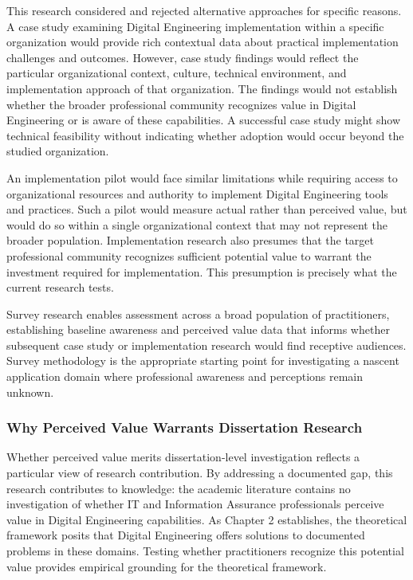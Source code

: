 This research considered and rejected alternative approaches for specific reasons. A case study examining Digital Engineering implementation within a specific organization would provide rich contextual data about practical implementation challenges and outcomes. However, case study findings would reflect the particular organizational context, culture, technical environment, and implementation approach of that organization. The findings would not establish whether the broader professional community recognizes value in Digital Engineering or is aware of these capabilities. A successful case study might show technical feasibility without indicating whether adoption would occur beyond the studied organization.

An implementation pilot would face similar limitations while requiring access to organizational resources and authority to implement Digital Engineering tools and practices. Such a pilot would measure actual rather than perceived value, but would do so within a single organizational context that may not represent the broader population. Implementation research also presumes that the target professional community recognizes sufficient potential value to warrant the investment required for implementation. This presumption is precisely what the current research tests.

Survey research enables assessment across a broad population of practitioners, establishing baseline awareness and perceived value data that informs whether subsequent case study or implementation research would find receptive audiences. Survey methodology is the appropriate starting point for investigating a nascent application domain where professional awareness and perceptions remain unknown.

\subsubsection{Why Perceived Value Warrants Dissertation Research}

Whether perceived value merits dissertation-level investigation reflects a particular view of research contribution. By addressing a documented gap, this research contributes to knowledge: the academic literature contains no investigation of whether IT and Information Assurance professionals perceive value in Digital Engineering capabilities. As Chapter 2 establishes, the theoretical framework posits that Digital Engineering offers solutions to documented problems in these domains. Testing whether practitioners recognize this potential value provides empirical grounding for the theoretical framework.

